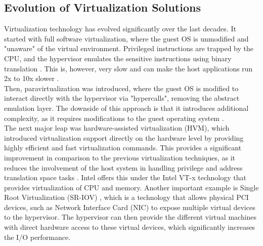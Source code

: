 \subsection{Evolution of Virtualization Solutions}
Virtualization technology has evolved significantly over the last decades. It started with full software virtualization, 
where the guest OS is unmodified and "unaware" of the virtual environment. Privileged instructions 
are trapped by the CPU, and the hypervisor emulates the sensitive instructions using 
binary translation \cite{virtualization_gregg}. This is, however, very slow and can make the host applications
run 2x to 10x slower \cite{virtualization_gregg}. \\
Then, paravirtualization was introduced, where the guest OS is modified to interact directly with the 
hypervisor via "hypercalls", removing the abstract emulation layer. The downside of this approach is that it introduces additional complexity, 
as it requires modifications to the guest operating system \cite{hvm}.\\ 
The next major leap was hardware-assisted virtualization (HVM), which introduced virtualization support 
directly on the hardware level by providing highly efficient and fast virtualization commands. 
This provides a significant improvement in comparison to the previous virtualization 
techniques, as it reduces the involvement of the host system in handling privilege and address translation
space tasks \cite{hvm}. Intel offers this under the Intel VT-x technology that provides virtualization of CPU and memory.
Another important example is Single Root Virtualization (SR-IOV) \cite{nitro_whitepaper}, which is a technology that allows physical 
PCI devices, such as Network Interface Card (NIC) to expose multiple virtual devices to the hypervisor. 
The hypervisor can then provide the different virtual machines with direct hardware access to these virtual 
devices, which significantly increases the I/O performance. 

